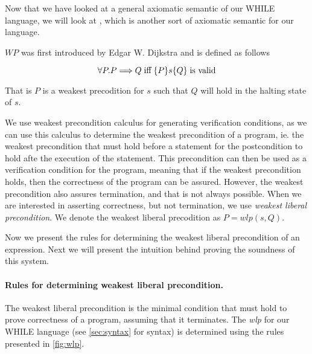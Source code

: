 Now that we have looked at a general axiomatic semantic of our WHILE language, we will look at , which is another sort of axiomatic semantic for our language.

$WP$ was first introduced by Edgar W. Dijkstra and is defined as follows

$$
\forall P. P \Longrightarrow Q \; \text{iff} \; \{P\}s\{Q\} \; \text{is valid}
$$

That is $P$ is a weakest precodition for $s$ such that $Q$ will hold in the halting state of $s$.

We use weakest precondition calculus for generating verification conditions, as we can use
this calculus to determine the weakest precondition of a program, ie. the weakest precondition
that must hold before a statement for the postcondition to hold afte the execution of the statement.
This precondition can then be used as a verification condition for the program, meaning that if the weakest precondition holds, then the correctness of the program can be assured.
However, the weakest precondition also assures termination, and that is not always possible. When we are interested in asserting correctness, but not termination, we use \textit{weakest liberal precondition}.
We denote the weakest liberal precodition as $P = wlp(s,Q)$.

Now we present the rules for determining the weakest liberal precondition of an expression.
Next we will present the intuition behind proving the soundness of this system.

\paragraph{Rules for determining weakest liberal precondition.}
The weakest liberal precondition is the minimal condition that must hold to prove correctness of a program, assuming that it terminates.
The \textit{wlp} for our WHILE language (see \ref{sec:syntax} for syntax) is determined using the rules presented in \autoref{fig:wlp}.

